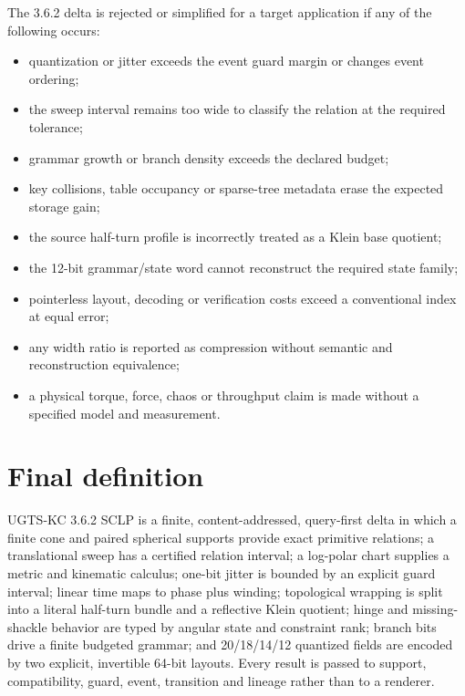 \documentclass[10pt,a4paper]{article}
\begin{document}
The 3.6.2 delta is rejected or simplified for a target application if any of the following occurs:
\begin{itemize}
\item quantization or jitter exceeds the event guard margin or changes event ordering;
\item the sweep interval remains too wide to classify the relation at the required tolerance;
\item grammar growth or branch density exceeds the declared budget;
\item key collisions, table occupancy or sparse-tree metadata erase the expected storage gain;
\item the source half-turn profile is incorrectly treated as a Klein base quotient;
\item the 12-bit grammar/state word cannot reconstruct the required state family;
\item pointerless layout, decoding or verification costs exceed a conventional index at equal error;
\item any width ratio is reported as compression without semantic and reconstruction equivalence;
\item a physical torque, force, chaos or throughput claim is made without a specified model and measurement.
\end{itemize}

\section{Final definition}

\begin{definitionbox}
UGTS-KC 3.6.2 SCLP is a finite, content-addressed, query-first delta in which a finite cone and paired spherical supports provide exact primitive relations; a translational sweep has a certified relation interval; a log-polar chart supplies a metric and kinematic calculus; one-bit jitter is bounded by an explicit guard interval; linear time maps to phase plus winding; topological wrapping is split into a literal half-turn bundle and a reflective Klein quotient; hinge and missing-shackle behavior are typed by angular state and constraint rank; branch bits drive a finite budgeted grammar; and 20/18/14/12 quantized fields are encoded by two explicit, invertible 64-bit layouts. Every result is passed to support, compatibility, guard, event, transition and lineage rather than to a renderer.
\end{definitionbox}
\end{document}

